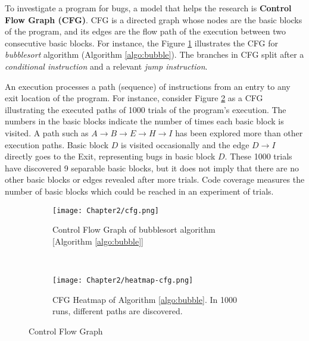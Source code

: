 To investigate a program for bugs, a model that helps the research is \textbf{Control Flow Graph (CFG)}. CFG is a directed graph whose nodes are the basic blocks of the program, and its edges are the flow path of the execution between two consecutive basic blocks. For instance, the Figure \ref{fig:cfg} illustrates the CFG for \textit{bubblesort} algorithm (Algorithm \ref{algo:bubble}). The branches in CFG split after a \textit{conditional instruction} and a relevant \textit{jump instruction}.



An execution processes a path (sequence) of instructions from an entry to any exit location of the program. For instance, consider Figure \ref{fig:cfg-heat} as a CFG illustrating the executed paths of 1000 trials of the program's execution. The numbers in the basic blocks indicate the number of times each basic block is visited. A path such as $A \rightarrow B \rightarrow E \rightarrow H \rightarrow I$ has been explored more than other execution paths. Basic block $D$ is visited occasionally and the edge $D \rightarrow I$ directly goes to the Exit, representing bugs in basic block $D$. These 1000 trials have discovered 9 separable basic blocks, but it does not imply that there are no other basic blocks or edges revealed after more trials. Code coverage measures the number of basic blocks which could be reached in an experiment of trials.

\begin{figure}[!t]
  \begin{adjustbox}{center,max width=1.3\textwidth}
    \begin{subfigure}[t]{0.35\textwidth}
      \centering
      \texttt{[image: Chapter2/cfg.png]}
      \vspace*{-5mm}
      \caption{Control Flow Graph of bubblesort algorithm [Algorithm \ref{algo:bubble}]}
      \label{fig:cfg}
      \vspace*{5mm}
    \end{subfigure}
    ~
    \hspace*{5mm}
    \begin{subfigure}[b]{0.35\textwidth}
      \centering
      \texttt{[image: Chapter2/heatmap-cfg.png]}
      \vspace*{-5mm}
      \caption{CFG Heatmap of Algorithm \ref{algo:bubble}. In 1000 runs, different paths are discovered.}
      \label{fig:cfg-heat}
      \vspace*{5mm}
    \end{subfigure}
  \end{adjustbox}
  \caption{Control Flow Graph}
  \label{fig:cfgs}
\end{figure}


